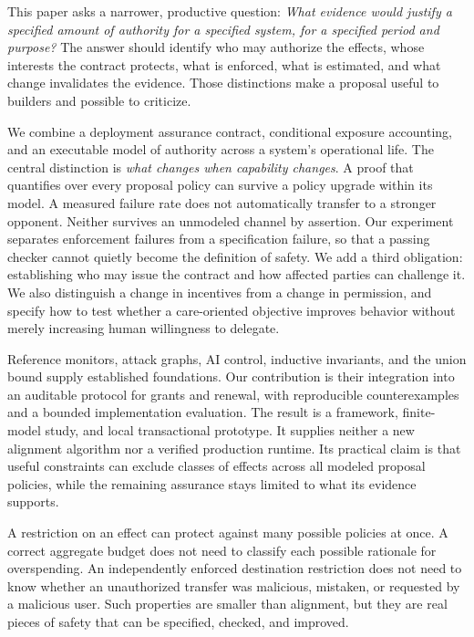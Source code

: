 This paper asks a narrower, productive question: \emph{What evidence would justify a specified amount of authority for a specified system, for a specified period and purpose?} The answer should identify who may authorize the effects, whose interests the contract protects, what is enforced, what is estimated, and what change invalidates the evidence. Those distinctions make a proposal useful to builders and possible to criticize.

 We combine a deployment assurance contract, conditional exposure accounting, and an executable model of authority across a system's operational life. The central distinction is \emph{what changes when capability changes}. A proof that quantifies over every proposal policy can survive a policy upgrade within its model. A measured failure rate does not automatically transfer to a stronger opponent. Neither survives an unmodeled channel by assertion. Our experiment separates enforcement failures from a specification failure, so that a passing checker cannot quietly become the definition of safety. We add a third obligation: establishing who may issue the contract and how affected parties can challenge it. We also distinguish a change in incentives from a change in permission, and specify how to test whether a care-oriented objective improves behavior without merely increasing human willingness to delegate.

Reference monitors, attack graphs, AI control, inductive invariants, and the union bound supply established foundations. Our contribution is their integration into an auditable protocol for grants and renewal, with reproducible counterexamples and a bounded implementation evaluation. The result is a framework, finite-model study, and local transactional prototype. It supplies neither a new alignment algorithm nor a verified production runtime. Its practical claim is that useful constraints can exclude classes of effects across all modeled proposal policies, while the remaining assurance stays limited to what its evidence supports.

 A restriction on an effect can protect against many possible policies at once. A correct aggregate budget does not need to classify each possible rationale for overspending. An independently enforced destination restriction does not need to know whether an unauthorized transfer was malicious, mistaken, or requested by a malicious user. Such properties are smaller than alignment, but they are real pieces of safety that can be specified, checked, and improved.
